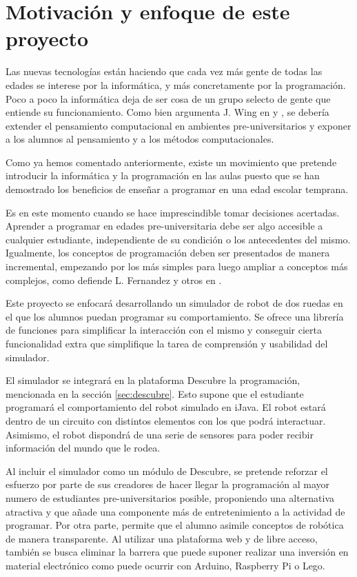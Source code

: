 {{\section{Motivación y enfoque de este proyecto}
\label{sec:motivacion}

Las nuevas tecnologías están haciendo que cada vez más gente de todas las edades se interese por la informática, y más concretamente por la programación. Poco a poco la informática deja de ser cosa de un grupo selecto de gente que entiende su funcionamiento. Como bien argumenta J. Wing en \cite{wing2006computational} y \cite{Wing3717}, se debería extender el pensamiento computacional en ambientes pre-universitarios y exponer a los alumnos al pensamiento y a los métodos computacionales.

Como ya hemos comentado anteriormente, existe un movimiento que pretende introducir la informática y la programación en las aulas puesto que se han demostrado los beneficios de enseñar a programar en una edad escolar temprana.

Es en este momento cuando se hace imprescindible tomar decisiones acertadas. Aprender a programar en edades pre-universitaria debe ser algo accesible a cualquier estudiante, independiente de su condición o los antecedentes del mismo. Igualmente, los conceptos de programación deben ser presentados de manera incremental, empezando por los más simples para luego ampliar a conceptos más complejos, como defiende L. Fernandez y otros en \cite{fernandez2002analisis}.

Este proyecto se enfocará desarrollando un simulador de robot de dos ruedas en el que los alumnos puedan programar su comportamiento. Se ofrece una librería de funciones para simplificar la interacción con el mismo y conseguir cierta funcionalidad extra que simplifique la tarea de comprensión y usabilidad del simulador.

El simulador se integrará en la plataforma Descubre la programación, mencionada en la sección \ref{sec:descubre}. Esto supone que el estudiante programará el comportamiento del robot simulado en iJava. El robot estará dentro de un circuito con distintos elementos con los que podrá interactuar. Asimismo, el robot dispondrá de una serie de sensores para poder recibir información del mundo que le rodea.

Al incluir el simulador como un módulo de Descubre, se pretende reforzar el esfuerzo por parte de sus creadores de hacer llegar la programación al mayor numero de estudiantes pre-universitarios posible, proponiendo una alternativa atractiva y que añade una componente más de entretenimiento a la actividad de programar. Por otra parte, permite que el alumno asimile conceptos de robótica de manera transparente. Al utilizar una plataforma web y de libre acceso, también se busca eliminar la barrera que puede suponer realizar una inversión en material electrónico como puede ocurrir con Arduino, Raspberry Pi o Lego.


}}
